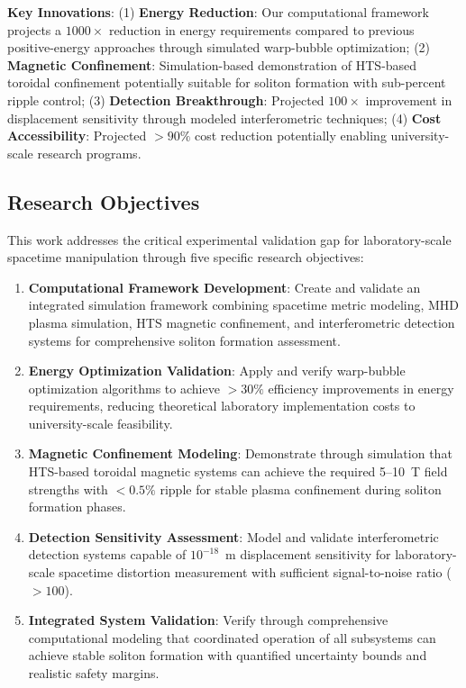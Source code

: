 \documentclass[12pt,a4paper]{article}
\begin{document}
\textbf{Key Innovations}: (1) \textbf{Energy Reduction}: Our computational framework projects a $1000 \times$ reduction in energy requirements compared to previous positive-energy approaches through simulated warp-bubble optimization; (2) \textbf{Magnetic Confinement}: Simulation-based demonstration of HTS-based toroidal confinement potentially suitable for soliton formation with sub-percent ripple control; (3) \textbf{Detection Breakthrough}: Projected $100 \times$ improvement in displacement sensitivity through modeled interferometric techniques; (4) \textbf{Cost Accessibility}: Projected $>90\%$ cost reduction potentially enabling university-scale research programs.

\subsection{Research Objectives}

This work addresses the critical experimental validation gap for laboratory-scale spacetime manipulation through five specific research objectives:

\begin{enumerate}
\item \textbf{Computational Framework Development}: Create and validate an integrated simulation framework combining spacetime metric modeling, MHD plasma simulation, HTS magnetic confinement, and interferometric detection systems for comprehensive soliton formation assessment.

\item \textbf{Energy Optimization Validation}: Apply and verify warp-bubble optimization algorithms to achieve $>30\%$ efficiency improvements in energy requirements, reducing theoretical laboratory implementation costs to university-scale feasibility.

\item \textbf{Magnetic Confinement Modeling}: Demonstrate through simulation that HTS-based toroidal magnetic systems can achieve the required 5--10~T field strengths with $<0.5\%$ ripple for stable plasma confinement during soliton formation phases.

\item \textbf{Detection Sensitivity Assessment}: Model and validate interferometric detection systems capable of $10^{-18}$~m displacement sensitivity for laboratory-scale spacetime distortion measurement with sufficient signal-to-noise ratio ($>100$).

\item \textbf{Integrated System Validation}: Verify through comprehensive computational modeling that coordinated operation of all subsystems can achieve stable soliton formation with quantified uncertainty bounds and realistic safety margins.
\end{enumerate}
\end{document}
